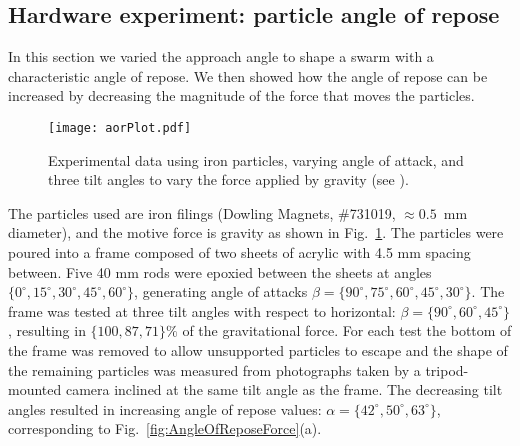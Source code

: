 \subsection{Hardware experiment: particle angle of repose}
In this section we varied the approach angle to shape a swarm with a characteristic angle of repose.  
We then showed how the angle of repose can be increased by decreasing the magnitude of the force that moves the particles.
%
\begin{figure}
\begin{center}
	\texttt{[image: aorPlot.pdf]}
\end{center}
\vspace{-1.5em}
\caption{\label{fig:angleOfReposeExp}
Experimental data using iron particles, varying angle of attack, and three tilt angles to vary the force applied by gravity (see \cite{shahrokhiICRAvideo2019}).
}\vspace{-1.5em}
\end{figure}
%
%
The particles used are iron filings (Dowling Magnets, \#731019, $\approx0.5$~mm diameter), and the motive force is gravity as shown in Fig.~\ref{fig:angleOfReposeExp}. 
The particles were poured into a frame composed of two sheets of acrylic with 4.5 mm spacing between. Five 40 mm rods were epoxied between the sheets at angles 
 $\{0^\circ,15^\circ, 30^\circ, 45^\circ, 60^\circ \}$, generating angle of attacks $\beta = \{90^\circ,75^\circ, 60^\circ, 45^\circ, 30^\circ \}$.
 The frame was tested at three tilt angles with respect to horizontal: $\beta = \{90^\circ,60^\circ, 45^\circ \}$, resulting in $\{100,87, 71\}\%$ of the gravitational force.
 For each test the bottom of the frame was removed to allow unsupported particles to escape and the shape of the remaining particles was measured from photographs taken by a tripod-mounted camera inclined at the same tilt angle as the frame.
  The decreasing tilt angles resulted in increasing angle of repose values: $\alpha = \{42^\circ,50^\circ, 63^\circ \}$, corresponding to Fig.~\ref{fig:AngleOfReposeForce}(a).

